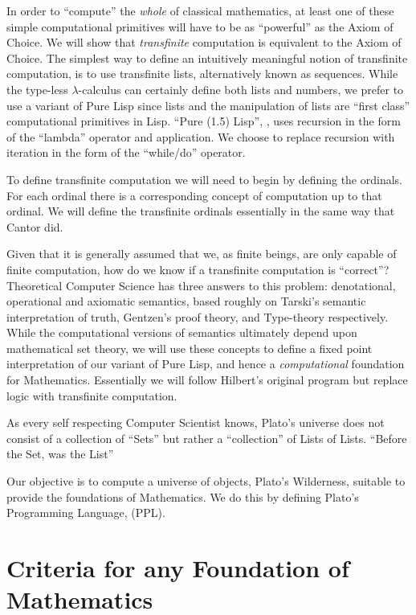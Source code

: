 In order to ``compute'' the \emph{whole} of classical mathematics, at least one
of these simple computational primitives will have to be as ``powerful'' as the
Axiom of Choice. We will show that \emph{transfinite} computation is equivalent
to the Axiom of Choice. The simplest way to define an intuitively meaningful
notion of transfinite computation, is to use transfinite lists, alternatively
known as sequences. While the type-less $\lambda$-calculus can certainly define
both lists and numbers, we prefer to use a variant of Pure Lisp since lists and
the manipulation of lists are ``first class'' computational primitives in Lisp.
``Pure (1.5) Lisp'', \cite{mcCarthy1960lisp}, uses recursion in the form of the
``lambda'' operator and application. We choose to replace recursion with
iteration in the form of the ``while/do'' operator.

To define transfinite computation we will need to begin by defining the
ordinals. For each ordinal there is a corresponding concept of computation up to
that ordinal. We will define the transfinite ordinals essentially in the same
way that Cantor did. 

Given that it is generally assumed that we, as finite beings, are only capable
of finite computation, how do we know if a transfinite computation is
``correct''? Theoretical Computer Science has three answers to this problem:
denotational, operational and axiomatic semantics, based roughly on Tarski's
semantic interpretation of truth, Gentzen's proof theory, and Type-theory
respectively. While the computational versions of semantics ultimately depend
upon mathematical set theory, we will use these concepts to define a fixed point
interpretation of our variant of Pure Lisp, and hence a \emph{computational}
foundation for Mathematics. Essentially we will follow Hilbert's original
program but replace logic with transfinite computation.

\begin{myQuote}
As every self respecting Computer Scientist knows, Plato's universe does not
consist of a collection of ``Sets'' but rather a ``collection'' of Lists of
Lists. \quad ``Before the Set, was the List''
\end{myQuote}

Our objective is to compute a universe of objects, Plato's Wilderness, suitable
to provide the foundations of Mathematics. We do this by defining Plato's
Programming Language, (PPL).

\section{Criteria for any Foundation of Mathematics}


